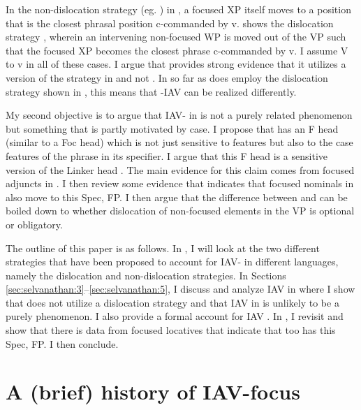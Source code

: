 \documentclass[output=paper,newtxmath,modfonts,nonflat,hidelinks]{langsci/langscibook}
\begin{document}
 
 
In the non-dislocation strategy (eg. \citealt{vanderwal2006}) in , a focused XP itself moves to a position that is the closest phrasal position c-commanded by v.  shows the dislocation strategy \citep{ChengDowning2009}, wherein an intervening non-focused WP is moved out of the VP such that the focused XP becomes the closest phrase c-commanded by v. I assume V to v  in all of these cases. I argue that  provides strong evidence that it utilizes a version of the strategy in  and not . In so far as  does employ the dislocation strategy shown in , this means that -IAV  can be realized differently. 

My second objective is to argue that IAV- in  is not a purely  related phenomenon but something that is partly motivated by case. I propose that  has an F head (similar to a Foc head) which is not just sensitive to  features but also to the case features of the phrase in its specifier. I argue that this F head is a  sensitive version of the Linker head \citep{Baker2006}. The main evidence for this claim comes from focused adjuncts in . I then review some evidence that indicates that focused nominals in  also move to this Spec, FP. I then argue that the difference between  and  can be boiled down to whether dislocation of non-focused elements in the VP is optional or obligatory.

The outline of this paper is as follows. In , I will look at the two different strategies that have been proposed to account for IAV- in different  languages, namely the dislocation and non-dislocation strategies. In Sections \ref{sec:selvanathan:3}--\ref{sec:selvanathan:5}, I discuss and analyze IAV  in  where I show that  does not utilize a dislocation strategy and that IAV  in  is unlikely to be a purely  phenomenon. I also provide a formal account for  IAV . In , I revisit  and show that there is data from focused locatives that indicate that  too has this Spec, FP. I then conclude.

\section{A (brief) history of IAV-focus}\label{sec:selvanathan:2}
\end{document}
